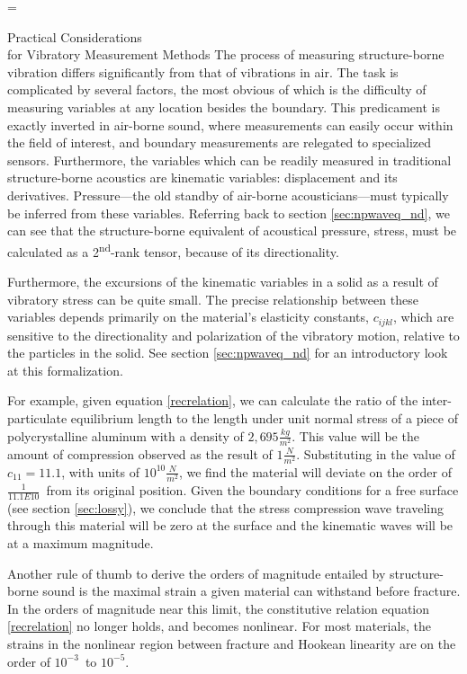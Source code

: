 \documentclass[a4paper,10pt]{report}
\makeatletter
\numberwithin{equation}{section}
\let\realnormalsize=\normalsize
\def\liih@math{\ifmmode$\else\bad@math\fi}
\def\adjustnormalsize{\def\normalsize{\mathsurround=0pt \realnormalsize
 \parindent=0pt\abovedisplayskip=0pt\belowdisplayskip=0pt}%
 \def\phantompar{\csname par\endcsname}\normalsize}%
\newcommand\lthtmlvboxmathA{\adjustnormalsize\setbox\sizebox=\vbox\bgroup %
 \let\ifinner=\iffalse \let\)\liih@math }%
\newcommand\lthtmlmathtype[1]{\gdef\lthtmlmathenv{#1}}%
\newcommand\lthtmlfigureA[1]{\let\@savefreelist\@freelist
       \lthtmlmathtype{#1}\lthtmlvboxmathA}%
\makeatother
\begin{document}
{\newpage\clearpage
\lthtmlfigureA{section1018}%
\begin{section}
{Practical Considerations\\for Vibratory Measurement Methods}
 The process of measuring structure-borne vibration differs significantly from that of vibrations in air. The task is complicated by several factors, the most obvious of which is the difficulty of measuring variables at any location besides the boundary. This predicament is exactly inverted in air-borne sound, where measurements can easily occur within the field of interest, and boundary measurements are relegated to specialized sensors. \cite[p.~3]{Cremer1973} Furthermore, the variables which can be readily measured in traditional structure-borne acoustics are kinematic variables: displacement and its derivatives. Pressure---the old standby of air-borne acousticians---must typically be inferred from these variables. Referring back to section \ref{sec:npwaveq_nd}, we can see that the structure-borne equivalent of acoustical pressure, stress, must be calculated as a 2\textsuperscript{nd}-rank tensor, because of its directionality. 
\par
Furthermore, the excursions of the kinematic variables in a solid as a result of vibratory stress can be quite small. The precise relationship between these variables depends primarily on the material's elasticity constants, $c_{ijkl}$, which are sensitive to the directionality and polarization of the vibratory motion, relative to the particles in the solid. See section \ref{sec:npwaveq_nd} for an introductory look at this formalization. 
\par
For example, given equation \eqref{recrelation}, we can calculate the ratio of the inter-particulate equilibrium length to the length under unit normal stress of a piece of polycrystalline aluminum with a density of $2,695 \frac{kg}{m^2}$. This value will be the amount of compression observed as the result of $1 \frac{N}{m^2}$. Substituting in the value of $c_{11} = 11.1$, with units of $10^{10} \frac{N}{m^2}$,\cite[p.~12]{Ballantine1997} we find the material will deviate on the order of $\frac{1}{11.1E10}$\  from its original position. Given the boundary conditions for a free surface (see section \ref{sec:lossy}), we conclude that the stress compression wave traveling through this material will be zero at the surface and the kinematic waves will be at a maximum magnitude. 
\par
Another rule of thumb to derive the orders of magnitude entailed by structure-borne sound is the maximal strain a given material can withstand before fracture. In the orders of magnitude near this limit, the constitutive relation equation \eqref{recrelation} no longer holds, and becomes nonlinear. For most materials, the strains in the nonlinear region between fracture and Hookean linearity are on the order of $10^{-3}$\  to $10^{-5}$. \cite[p.~16]{Ballantine1997}

\end{section}}
\end{document}
